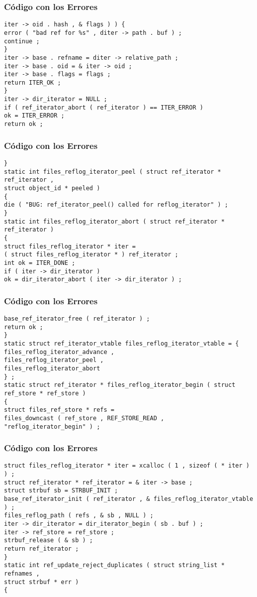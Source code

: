 \documentclass{beamer}
\begin{document}
\begin{frame}[fragile]
\frametitle{C\'odigo con los Errores}
\begin{verbatim}
iter -> oid . hash , & flags ) ) { 
error ( "bad ref for %s" , diter -> path . buf ) ; 
continue ; 
} 
iter -> base . refname = diter -> relative_path ; 
iter -> base . oid = & iter -> oid ; 
iter -> base . flags = flags ; 
return ITER_OK ; 
} 
iter -> dir_iterator = NULL ; 
if ( ref_iterator_abort ( ref_iterator ) == ITER_ERROR ) 
ok = ITER_ERROR ; 
return ok ; 
\end{verbatim}
\end{frame}
\begin{frame}[fragile]
\frametitle{C\'odigo con los Errores}
\begin{verbatim}
} 
static int files_reflog_iterator_peel ( struct ref_iterator * ref_iterator , 
struct object_id * peeled ) 
{ 
die ( "BUG: ref_iterator_peel() called for reflog_iterator" ) ; 
} 
static int files_reflog_iterator_abort ( struct ref_iterator * ref_iterator ) 
{ 
struct files_reflog_iterator * iter = 
( struct files_reflog_iterator * ) ref_iterator ; 
int ok = ITER_DONE ; 
if ( iter -> dir_iterator ) 
ok = dir_iterator_abort ( iter -> dir_iterator ) ; 
\end{verbatim}
\end{frame}
\begin{frame}[fragile]
\frametitle{C\'odigo con los Errores}
\begin{verbatim}
base_ref_iterator_free ( ref_iterator ) ; 
return ok ; 
} 
static struct ref_iterator_vtable files_reflog_iterator_vtable = { 
files_reflog_iterator_advance , 
files_reflog_iterator_peel , 
files_reflog_iterator_abort 
} ; 
static struct ref_iterator * files_reflog_iterator_begin ( struct ref_store * ref_store ) 
{ 
struct files_ref_store * refs = 
files_downcast ( ref_store , REF_STORE_READ , 
"reflog_iterator_begin" ) ; 
\end{verbatim}
\end{frame}
\begin{frame}[fragile]
\frametitle{C\'odigo con los Errores}
\begin{verbatim}
struct files_reflog_iterator * iter = xcalloc ( 1 , sizeof ( * iter ) ) ; 
struct ref_iterator * ref_iterator = & iter -> base ; 
struct strbuf sb = STRBUF_INIT ; 
base_ref_iterator_init ( ref_iterator , & files_reflog_iterator_vtable ) ; 
files_reflog_path ( refs , & sb , NULL ) ; 
iter -> dir_iterator = dir_iterator_begin ( sb . buf ) ; 
iter -> ref_store = ref_store ; 
strbuf_release ( & sb ) ; 
return ref_iterator ; 
} 
static int ref_update_reject_duplicates ( struct string_list * refnames , 
struct strbuf * err ) 
{ 
\end{verbatim}
\end{frame}
\end{document}
